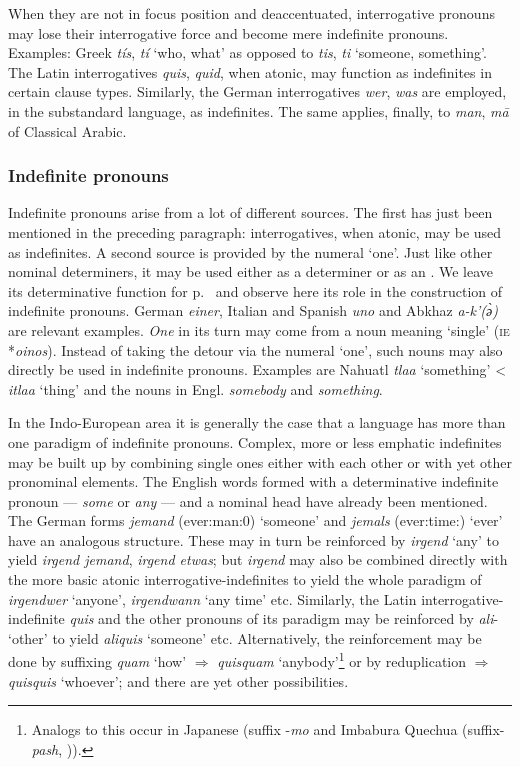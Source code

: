 When they are not in focus position and deaccentuated, interrogative pronouns may lose their interrogative force and become mere indefinite pronouns. Examples: Greek \textit{tís}, \textit{tí} ‘who, what’ as opposed to \textit{tis}, \textit{ti} ‘someone, something’. The Latin interrogatives \textit{quis}, \textit{quid}, when atonic, may function as indefinites in certain clause types. Similarly, the German interrogatives \textit{wer}, \textit{was} are employed, in the substandard language, as indefinites. The same applies, finally, to \textit{man}, \textit{m\=a} of Classical Arabic.

\subsubsection{Indefinite pronouns}
Indefinite pronouns arise from a lot of different sources. The first has just been mentioned in the preceding paragraph: interrogatives, when atonic, may be used as indefinites. A second source is provided by the numeral ‘one’. Just like other nominal determiners, it may be used either as a determiner or as an \np. We leave its determinative function for p.~\pageref{p56} and observe here its role in the construction of indefinite pronouns. German \textit{einer}, Italian and Spanish \textit{uno} and Abkhaz \textit{a-k'(\`ә)} are relevant examples. \textit{One} in its turn may come from a noun meaning ‘single’ (\textsc{ie} *\textit{oinos}). Instead of taking the detour via the numeral ‘one’, such nouns may also directly be used in indefinite pronouns. Examples are Nahuatl \textit{tlaa} ‘something’ {\textless} \textit{itlaa} ‘thing’ and the nouns in Engl. \textit{somebody} and \textit{something}.

In the Indo-European area it is generally the case that a language has more than one paradigm of indefinite pronouns. Complex, more or less emphatic indefinites may be built up by combining single ones either with each other or with yet other pronominal elements. The English words formed with a determinative indefinite pronoun — \textit{some} or \textit{any} — and a nominal head have already been mentioned. The German forms \textit{jemand} (ever:man:0) ‘someone’ and \textit{jemals} (ever:time:\advr) ‘ever’ have an analogous structure. These may in turn be reinforced by \textit{irgend} ‘any’ to yield \textit{irgend jemand}, \textit{irgend etwas}; but \textit{irgend} may also be combined directly with the more basic atonic interrogative-indefinites to yield the whole paradigm of \textit{irgendwer} ‘anyone’, \textit{irgendwann} ‘any time’ etc. Similarly, the Latin interrogative-indefinite \textit{quis} and the other pronouns of its paradigm may be reinforced by \textit{ali}{}- ‘other’ to yield \textit{aliquis} ‘someone’ etc. Alternatively, the reinforcement may be done by suffixing \textit{quam} ‘how’ $\Rightarrow $ \textit{quisquam} ‘anybody’\footnote{Analogs to this occur in Japanese (suffix -\textit{mo} and Imbabura Quechua (suffix-\textit{pash}, \citealt[131]{Cole1982})).} or by reduplication $\Rightarrow $ \textit{quisquis} ‘whoever’; and there are yet other possibilities.

